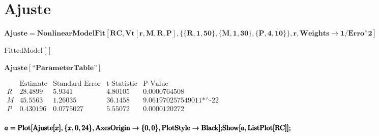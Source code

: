 \documentclass{article}
\begin{document}
\section*{Ajuste }

\begin{doublespace}
\noindent\(\pmb{\text{Ajuste}= \text{NonlinearModelFit}[\text{RC},\text{Vt}[r,M,R,P],\{\{R,1,50\},\{M,1,30\},\{P,4,10\}\},r, \text{Weights}\to 1/\text{Erro}{}^{\wedge}2]}\)
\end{doublespace}

\begin{doublespace}
\noindent\(\text{FittedModel}\left[\right]\)
\end{doublespace}

\begin{doublespace}
\noindent\(\pmb{\text{Ajuste}[\text{{``}ParameterTable{''}}]}\)
\end{doublespace}

\begin{doublespace}
\noindent\(\begin{array}{l|llll}
 \text{} & \text{Estimate} & \text{Standard Error} & \text{t-Statistic} & \text{P-Value} \\
\hline
 R & 28.4899 & 5.9341 & 4.80105 & 0.0000764508 \\
 M & 45.5563 & 1.26035 & 36.1458 & \text{9.061970257549011$\grave{ }$*${}^{\wedge}$-22} \\
 P & 0.430196 & 0.0775027 & 5.55072 & 0.0000120272 \\
\end{array}\)
\end{doublespace}

\begin{doublespace}
\noindent\(\pmb{\text{}}\\
\pmb{a=\text{Plot}[\text{Ajuste}[x],\{x,0,24\},\text{AxesOrigin}\to \{0,0\}, \text{PlotStyle}\to \text{Black}];}\\
\pmb{\text{Show}[a,\text{ListPlot}[\text{RC}]];}\)
\end{doublespace}
\end{document}
